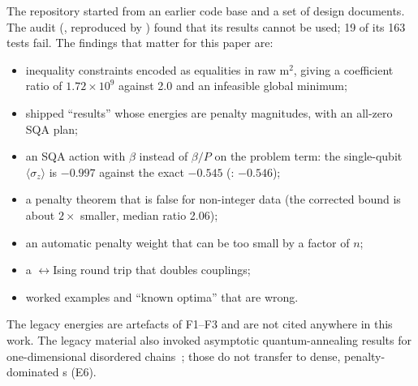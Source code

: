 The repository started from an earlier code base and a set of design documents. The audit
(, reproduced by ) found that its results cannot be
used; 19 of its 163 tests fail. The findings that matter for this paper are:
\begin{itemize}
\item[F1] inequality constraints encoded as equalities in raw m$^2$, giving a coefficient ratio of
$1.72\times10^{9}$ against 2.0 and an infeasible global minimum;
\item[F2] shipped ``results'' whose energies are penalty magnitudes, with an all-zero SQA plan;
\item[F3] an SQA action with $\beta$ instead of $\beta/P$ on the problem term: the single-qubit
$\langle\sigma_z\rangle$ is $-0.997$ against the exact $-0.545$ (: $-0.546$);
\item[F4] a penalty theorem that is false for non-integer data (the corrected bound is about
$2\times$ smaller, median ratio 2.06);
\item[F5] an automatic penalty weight that can be too small by a factor of $n$;
\item[F6] a \QUBO{}$\leftrightarrow$Ising round trip that doubles couplings;
\item[F7] worked examples and ``known optima'' that are wrong.
\end{itemize}
The legacy energies are artefacts of F1--F3 and are not cited anywhere in this work. The legacy
material also invoked asymptotic quantum-annealing results for one-dimensional disordered
chains~\cite{santoro2002}; those do not transfer to dense, penalty-dominated \QUBO{}s (E6).
